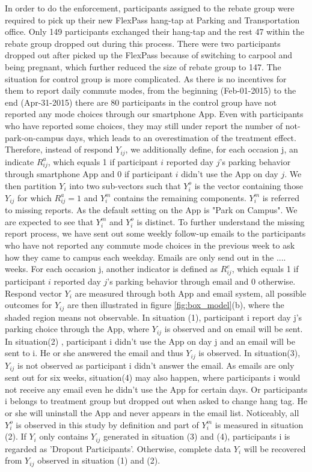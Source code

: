 \documentclass[preprint,12pt]{elsarticle}
\begin{document}
In order to do the enforcement, participants assigned to the rebate group were required to pick up their new FlexPass hang-tap at Parking and Transportation office. Only 149 participants exchanged their hang-tap and the rest 47 within the rebate group dropped out during this process. There were two participants dropped out after picked up the FlexPass because of switching to carpool and being pregnant, which further reduced the size of rebate group to 147. The situation for control group is more complicated. As there is no incentives for them to report daily commute modes, from the beginning (Feb-01-2015) to the end (Apr-31-2015) there are 80 participants in the control group have not reported any mode choices through our smartphone App. Even with participants who have reported some choices, they may still under report the number of not-park-on-campus days, which leads to an overestimation of the treatment effect. Therefore, instead of respond $Y_{ij}$, we additionally define, for each occasion j, an indicate $R_{ij}^a$, which equals 1 if participant $i$ reported day $j$'s parking behavior through smartphone App and 0 if participant $i$ didn't use the App on day $j$. We then partition $Y_i$ into two sub-vectors such that $Y^o_i$ is the vector containing those $Y_{ij}$ for which $R_{ij}^a=1$ and $Y^m_i$ contains the remaining components. $Y^m_i$ is referred to missing reports. As the default setting on the App is "Park on Campus". We are expected to see that $Y^m_i$ and $Y^o_i$ is distinct. To further understand the missing report process, we have sent out some weekly follow-up emails to the participants who have not reported any commute mode choices in the previous week to ask how they came to campus each weekday. Emails are only send out in the .... weeks. For each occasion j, another indicator is defined as $R_{ij}^e$, which equals 1 if participant $i$ reported day $j$'s parking behavior through email and 0 otherwise.
\\
 
Respond vector $Y_i$ are measured through both App and email system, all possible outcomes for $Y_{ij}$ are then illustrated in figure \ref{fig:box_model}(b), where the shaded region means not observable. In situation (1), participant i report day j's parking choice through the App, where $Y_{ij}$ is observed and on email will be sent. In situation(2) , participant i didn't use the App on day j and an email will be sent to i. He or she answered the email and thus $Y_{ij}$ is observed. In situation(3), $Y_{ij}$ is not observed as participant i didn't answer the email. As emails are only sent out for six weeks, situation(4) may also happen, where participants i would not receive any email even he didn't use the App for certain days. Or participants i belongs to treatment group but dropped out when asked to change hang tag. He or she will uninstall the App and never appears in the email list. Noticeably, all $Y^o_i$ is observed in this study by definition and part of $Y^m_i$ is measured in situation (2). If $Y_i$ only contains $Y_{ij}$ generated in situation (3) and (4), participants i is regarded as 'Dropout Participants'. Otherwise, complete data $Y_i$ will be recovered from $Y_{ij}$ observed in situation (1) and (2).\\
\end{document}
